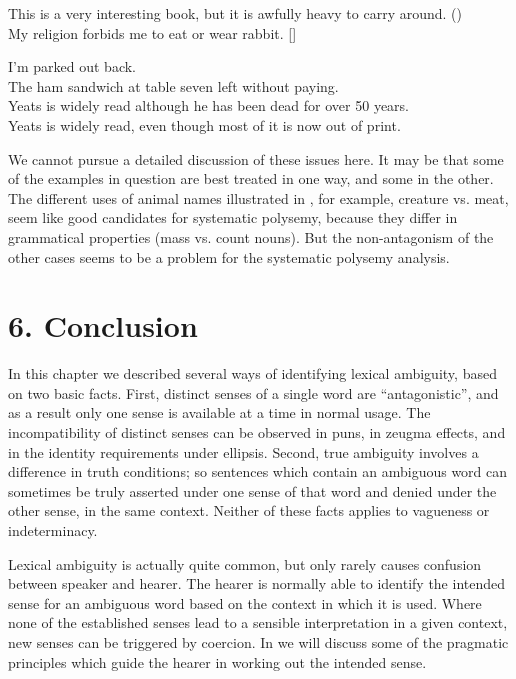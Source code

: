 \ea \label{ex:5.23}
\ea This is a very interesting book, but it is awfully heavy to carry around. (\citealt{Cruse2004})\\
\ex My religion forbids me to eat or wear rabbit.  [\citealt{NunbergZaenen1992}]
                       \z
\z

\ea \label{ex:5.24}
\ea I’m parked out back.\\
\ex The ham sandwich at table seven left without paying.\\
\ex Yeats is widely read although he has been dead for over 50 years.\\
\ex Yeats is widely read, even though most of it is now out of print.
                       \z
\z

\ea \label{ex:5.25}
                       \z
\z


We cannot pursue a detailed discussion of these issues here. It may be that some of the examples in question are best treated in one way, and some in the other. The different uses of animal names illustrated in , for example, creature vs. meat, seem like good candidates for systematic polysemy, because they differ in grammatical properties (mass vs. count nouns). But the non-antagonism of the other cases seems to be a problem for the systematic polysemy analysis.


\section{6. Conclusion}\label{sec:}

In this chapter we described several ways of identifying lexical ambiguity, based on two basic facts. First, distinct senses of a single word are “antagonistic”, and as a result only one sense is available at a time in normal usage. The incompatibility of distinct senses can be observed in puns, in zeugma effects, and in the identity requirements under ellipsis. Second, true ambiguity involves a difference in truth conditions; so sentences which contain an ambiguous word can sometimes be truly asserted under one sense of that word and denied under the other sense, in the same context. Neither of these facts applies to vagueness or indeterminacy.



Lexical ambiguity is actually quite common, but only rarely causes confusion between speaker and hearer. The hearer is normally able to identify the intended sense for an ambiguous word based on the context in which it is used. Where none of the established senses lead to a sensible interpretation in a given context, new senses can be triggered by coercion. In  we will discuss some of the pragmatic principles which guide the hearer in working out the intended sense.



